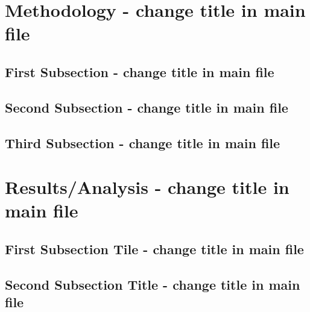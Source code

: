 \documentclass[12pt]{article}
\begin{document}
\begin{spacing}{1}
\end{spacing}


\begin{spacing}{1.5}
\section{Methodology - change title in main file} 

\subsection{First Subsection - change title in main file}  

\subsection{Second Subsection - change title in main file} 

\subsection{Third Subsection - change title in main file} 



\bigskip



\section{Results/Analysis - change title in main file}

\subsection{First Subsection Tile - change title in main file}

\subsection{Second Subsection Title - change title in main file}


\end{spacing}
\end{document}
